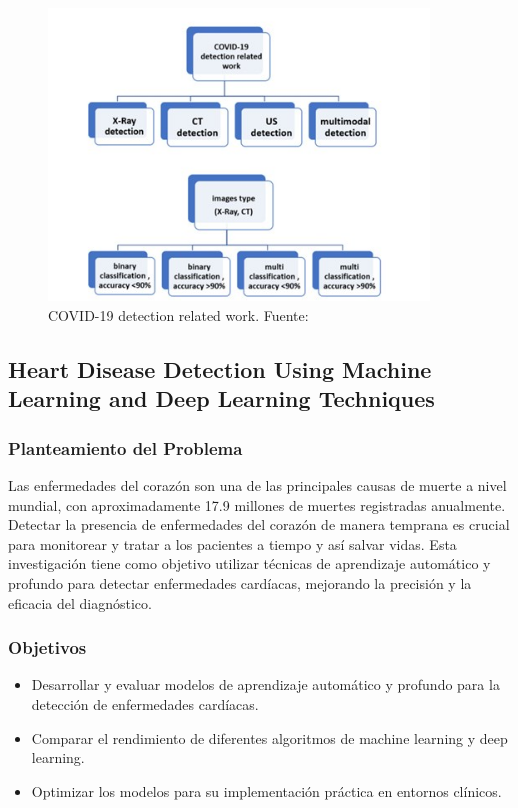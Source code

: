 \begin{figure}[H]
    \centering
    \includegraphics[width=0.9\textwidth]{images_repo/ESTRUCTURADETECCIONCOVID.jpg}
    \caption{COVID-19 detection related work. Fuente: \cite{sharma2020deep}}
    \label{fig:COVID19_diagn}
\end{figure}

\FloatBarrier

\subsection{Heart Disease Detection Using Machine Learning and Deep Learning Techniques \citep{jiang2020heart}}

\subsubsection{Planteamiento del Problema}

Las enfermedades del corazón son una de las principales causas de muerte a nivel mundial, con aproximadamente 17.9 millones de muertes registradas anualmente. Detectar la presencia de enfermedades del corazón de manera temprana es crucial para monitorear y tratar a los pacientes a tiempo y así salvar vidas. Esta investigación tiene como objetivo utilizar técnicas de aprendizaje automático y profundo para detectar enfermedades cardíacas, mejorando la precisión y la eficacia del diagnóstico.

\subsubsection{Objetivos}
\begin{itemize}
 \item Desarrollar y evaluar modelos de aprendizaje automático y profundo para la detección de enfermedades cardíacas.
 \item Comparar el rendimiento de diferentes algoritmos de machine learning y deep learning.
 \item Optimizar los modelos para su implementación práctica en entornos clínicos.
\end{itemize}

